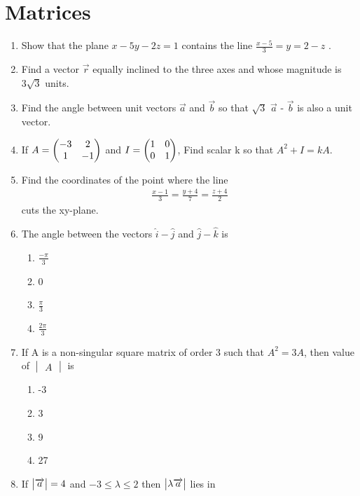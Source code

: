 \documentclass[journal,12pt,twocolumn]{IEEEtran}
\renewcommand\thesection{\arabic{section}}
\begin{document}
\section{Matrices}
\renewcommand{\theequation}{\theenumi}
\begin{enumerate}[label=\thesection.\arabic*.,ref=\thesection.\theenumi]
\item Show that the plane $ x-5y-2z=1 $ contains the line $ \frac{x-5}{3}=y=2-z $ .\\
\item  Find a vector $\overrightarrow{r}$ equally inclined to the three axes and whose magnitude is $3\sqrt{3}$ units.   
\item Find the angle between unit vectors $\overrightarrow{a}$ and $\overrightarrow{b}$ so that $\sqrt{3}$ $\overrightarrow{a}$ - $\overrightarrow{b}$ is also a unit vector.\\
\item If $A=\begin{pmatrix}-3 & 2 \\ 1 & -1\end{pmatrix} $ and $ I=\begin{pmatrix}1 & 0 \\ 0 & 1\end{pmatrix}$, Find scalar k so that $A^2 + I = kA$.\\
\item  Find the coordinates of the point where the line 
        \begin{align}
        \frac{x-1}{3} = \frac{y+4}{7} = \frac{z+4}{2}
        \nonumber
	\end{align} 
        cuts the xy-plane. \\
\item  The angle between the vectors $ \hat{i} - \hat{j} $ and $ \hat{j} - \hat{k} $ is

\begin{enumerate}
    \item $\frac{-\pi}{3}$
    \item 0
    \item $\frac{\pi}{3}$
    \item $\frac{2\pi}{3}$
\end{enumerate}

\item  If A is a non-singular square matrix of order 3 such that $ A^2 =3A $, then value of  $\begin{vmatrix}A \end{vmatrix}$ is

\begin{enumerate}
    \item -3
     \item 3
     \item 9
     \item 27
\end{enumerate}
\item  If $\begin{vmatrix}\overrightarrow{a}\end{vmatrix} = 4 $ and  $ -3\leq \lambda \leq 2 $ then $\begin{vmatrix}\lambda \overrightarrow{a}\end{vmatrix} $ lies in


\end{enumerate}
\end{document}
